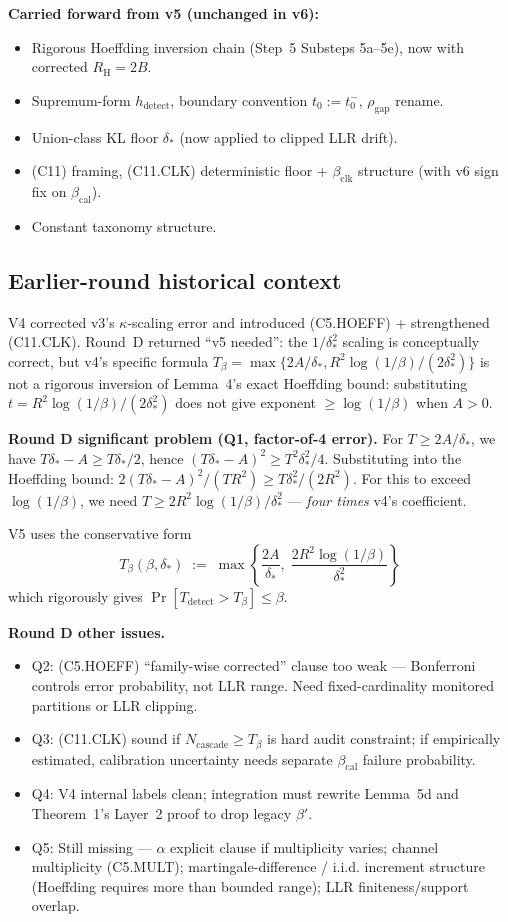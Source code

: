 \documentclass{article}
\newcommand{\deltastar}{\delta_{*}}
\newcommand{\rhogap}{\rho_{\mathrm{gap}}}
\newcommand{\Tbeta}{T_{\beta}}
\newcommand{\Ncasc}{N_{\mathrm{cascade}}}
\newcommand{\bclk}{\beta_{\mathrm{clk}}}
\newcommand{\bcal}{\beta_{\mathrm{cal}}}
\newcommand{\Bclip}{B}
\newcommand{\Rh}{R_{\mathrm{H}}}
\begin{document}
\textbf{Carried forward from v5 (unchanged in v6):}
\begin{itemize}
\item Rigorous Hoeffding inversion chain (Step~5 Substeps 5a--5e),
  now with corrected $\Rh = 2\Bclip$.
\item Supremum-form $h_{\mathrm{detect}}$, boundary convention
  $t_0 := t_0^-$, $\rhogap$ rename.
\item Union-class KL floor $\deltastar$ (now applied to clipped
  LLR drift).
\item (C11) framing, (C11.CLK) deterministic floor + $\bclk$
  structure (with v6 sign fix on $\bcal$).
\item Constant taxonomy structure.
\end{itemize}

\subsection*{Earlier-round historical context}

V4 corrected v3's $\kappa$-scaling error and introduced (C5.HOEFF)
+ strengthened (C11.CLK).  Round~D returned ``v5 needed'': the
$1/\deltastar^2$ scaling is conceptually correct, but v4's
specific formula
$\Tbeta = \max\{2A/\deltastar, R^2\log(1/\beta)/(2\deltastar^2)\}$
is not a rigorous inversion of Lemma~4's exact Hoeffding bound:
substituting $t = R^2\log(1/\beta)/(2\deltastar^2)$ does not give
exponent $\geq \log(1/\beta)$ when $A > 0$.

\textbf{Round D significant problem (Q1, factor-of-4 error).}
For $T \geq 2A/\deltastar$, we have $T\deltastar - A \geq
T\deltastar/2$, hence $(T\deltastar - A)^2 \geq T^2\deltastar^2/4$.
Substituting into the Hoeffding bound:
$2(T\deltastar - A)^2/(TR^2) \geq T\deltastar^2/(2R^2)$.
For this to exceed $\log(1/\beta)$, we need $T \geq 2R^2\log(1/\beta)/
\deltastar^2$ — \emph{four times} v4's coefficient.

V5 uses the conservative form
\[
  \Tbeta(\beta, \deltastar) \;:=\; \max\!\left\{
  \frac{2A}{\deltastar},\;
  \frac{2 R^2 \log(1/\beta)}{\deltastar^2}\right\}
\]
which rigorously gives $\Pr[T_{\mathrm{detect}} > \Tbeta] \leq
\beta$.

\textbf{Round D other issues.}
\begin{itemize}
\item Q2: (C5.HOEFF) ``family-wise corrected'' clause too weak —
  Bonferroni controls error probability, not LLR range. Need
  fixed-cardinality monitored partitions or LLR clipping.
\item Q3: (C11.CLK) sound if $\Ncasc \geq \Tbeta$ is hard audit
  constraint; if empirically estimated, calibration uncertainty
  needs separate $\bcal$ failure probability.
\item Q4: V4 internal labels clean; integration must rewrite
  Lemma~5d and Theorem~1's Layer~2 proof to drop legacy $\beta'$.
\item Q5: Still missing — $\alpha$ explicit clause if multiplicity
  varies; channel multiplicity (C5.MULT); martingale-difference /
  i.i.d. increment structure (Hoeffding requires more than bounded
  range); LLR finiteness/support overlap.
\end{itemize}
\end{document}
